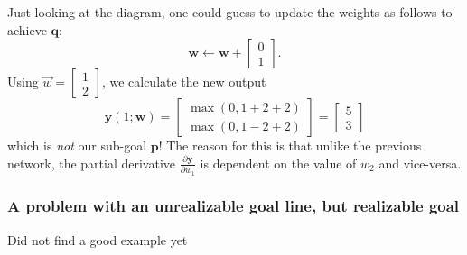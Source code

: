 \documentclass{article}
\let\vec\mathbf
\begin{document}
Just looking at the diagram, one could guess to update the weights as follows to achieve $\vec{q}$:
\begin{equation*}
    \vec{w} \leftarrow \vec{w} +
    \begin{bmatrix}
        0 \\
        1
    \end{bmatrix}.
\end{equation*}
Using $\Vec{w} = \begin{bmatrix} 1 \\ 2 \end{bmatrix}$, we calculate the new output
\begin{equation*}
    \vec{y}(1; \vec{w})
    = 
    \begin{bmatrix}
        \max \left( 0, 1 + 2 + 2 \right) \\
        \max \left( 0, 1 - 2 + 2 \right)
    \end{bmatrix}
    =
    \begin{bmatrix}
        5 \\
        3
    \end{bmatrix}
\end{equation*}
which is \textit{not} our sub-goal $\vec{p}$! The reason for this is that unlike the previous network, the partial derivative $\frac{\partial \vec{y}}{\partial w_1}$ is dependent on the value of $w_2$ and vice-versa.


\subsubsection{A problem with an unrealizable goal line, but realizable goal}
Did not find a good example yet





\end{document}

